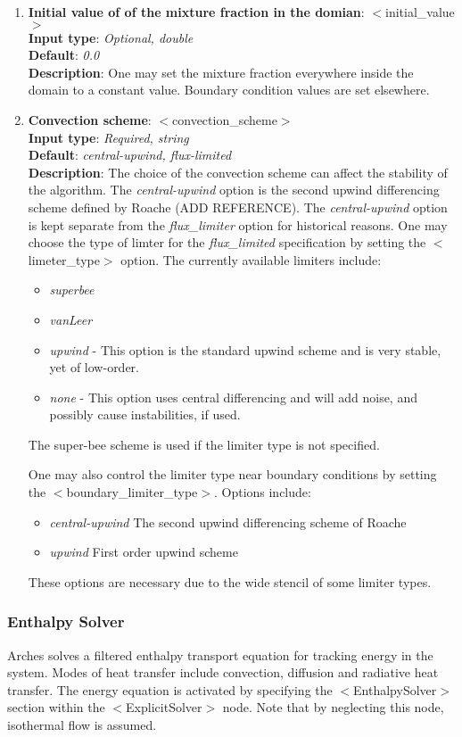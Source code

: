 \begin{enumerate}
%
\item {\bf Initial value of of the mixture fraction in the domian}: $<$initial\_value$>$ \\
{\bf Input type}: {\it Optional, double} \\
{\bf Default}: {\it 0.0 } \\ 
{\bf Description}: One may set the mixture fraction everywhere inside the domain to a constant value.  Boundary condition values are set elsewhere. 
%
\item {\bf Convection scheme}: $<$convection\_scheme$>$ \\
{\bf Input type}: {\it Required, string} \\
{\bf Default}: {\it central-upwind, flux-limited } \\ 
{\bf Description}: The choice of the convection scheme can affect the stability of the algorithm.  The {\it central-upwind} option is the second upwind differencing scheme defined by Roache (ADD REFERENCE).  The {\it central-upwind} option is kept separate from the {\it flux\_limiter} option for historical reasons.  One may choose the type of limter for the {\it flux\_limited} specification by setting the  $<$limeter\_type$>$ option.  The currently available limiters include: 
\begin{itemize}
\item {\it superbee}
\item {\it vanLeer}
\item {\it upwind} - This option is the standard upwind scheme and is very stable, yet of low-order.
\item {\it none} - This option uses central differencing and will add noise, and possibly cause instabilities, if used. 
\end{itemize}
The super-bee scheme is used if the limiter type is not specified.  

One may also control the limiter type near boundary conditions by setting the $<$boundary\_limiter\_type$>$.  Options include:
\begin{itemize}
\item {\it central-upwind} The second upwind differencing scheme of Roache
\item {\it upwind} First order upwind scheme
\end{itemize}
These options are necessary due to the wide stencil of some limiter types. 
%
\end{enumerate}

\subsubsection{Enthalpy Solver}
Arches solves a filtered enthalpy transport equation for tracking energy in the system.  Modes of heat transfer include convection, diffusion and radiative heat transfer.  The energy equation is activated by specifying the $<$EnthalpySolver$>$ section within the $<$ExplicitSolver$>$ node.  Note that by neglecting this node, isothermal flow is assumed.  

